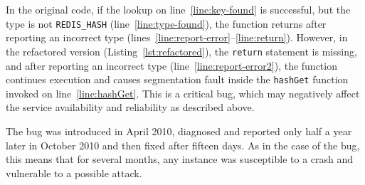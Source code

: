 In the original code, if the lookup on line~\ref{line:key-found} is successful,
but the type is not \lstinline`REDIS_HASH` (line~\ref{line:type-found}), the
function returns after reporting an incorrect type
(lines~\ref{line:report-error}--\ref{line:return}). However, in the refactored
version (Listing~\ref{lst:refactored}), the \lstinline`return` statement is
missing, and after reporting an incorrect type (line~\ref{line:report-error2}),
the function continues execution and causes segmentation fault inside the
\lstinline`hashGet` function invoked on line~\ref{line:hashGet}. This is a
critical bug, which may negatively affect the service availability and
reliability as described above.

The bug was introduced in April 2010, diagnosed and reported only half a year
later in October 2010 and then fixed after fifteen days. As in the case of the
\lighttpd bug, this means that for several months, any \redis instance was
susceptible to a crash and vulnerable to a possible attack.
